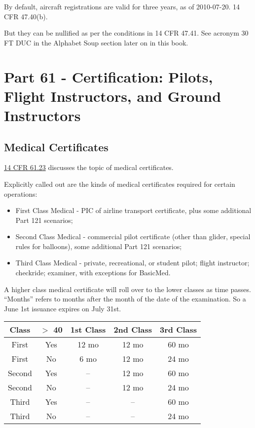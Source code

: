 By default, aircraft registrations are valid for three years, as of 2010-07-20. 14 CFR 47.40(b).

But they can be nullified as per the conditions in 14 CFR 47.41. See acronym 30 FT DUC in the Alphabet Soup section later on in this book.

\section{Part 61 - Certification: Pilots, Flight Instructors, and Ground Instructors}

\subsection{Medical Certificates}

\href{https://www.ecfr.gov/current/title-14/chapter-I/subchapter-D/part-61/subpart-A/section-61.23}{14 CFR 61.23} discusses the topic of medical certificates.

Explicitly called out are the kinds of medical certificates required for certain operations:

\begin{itemize}
\item First Class Medical - PIC of airline transport certificate, plus some additional Part 121 scenarios;
\item Second Class Medical - commercial pilot certificate (other than glider, special rules for balloons), some additional Part 121 scenarios;
\item Third Class Medical - private, recreational, or student pilot; flight instructor; checkride; examiner, with exceptions for BasicMed.
\end{itemize}

A higher class medical certificate will roll over to the lower classes as time passes. ``Months'' refers to months after the month of the date of the examination. So a June 1st issuance expires on July 31st.

\begin{center}
\begin{tabular}{ |c|c|c|c|c| }
\hline
Class & $>$ 40 & 1st Class & 2nd Class & 3rd Class \\
\hline
First & Yes      & 12 mo & 12 mo & 60 mo \\
First & No       &  6 mo & 12 mo & 24 mo \\
\hline
Second & Yes     & --        & 12 mo & 60 mo \\
Second & No      & --        & 12 mo & 24 mo \\
\hline
Third & Yes      & --        & --        & 60 mo \\
Third & No       & --        & --        & 24 mo \\
\hline
\end{tabular}
\end{center}

